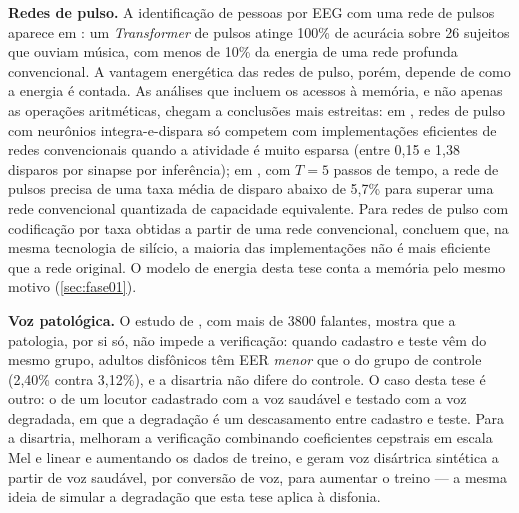 			\par \textbf{Redes de pulso.} A identificação de pessoas por \ac{EEG} com uma rede de pulsos aparece em : um \textit{Transformer} de pulsos atinge 100\% de acurácia sobre 26 sujeitos que ouviam música, com menos de 10\% da energia de uma rede profunda convencional. A vantagem energética das redes de pulso, porém, depende de como a energia é contada. As análises que incluem os acessos à memória, e não apenas as operações aritméticas, chegam a conclusões mais estreitas: em , redes de pulso com neurônios integra-e-dispara só competem com implementações eficientes de redes convencionais quando a atividade é muito esparsa (entre 0,15 e 1,38 disparos por sinapse por inferência); em , com $T=5$ passos de tempo, a rede de pulsos precisa de uma taxa média de disparo abaixo de 5,7\% para superar uma rede convencional quantizada de capacidade equivalente. Para redes de pulso com codificação por taxa obtidas a partir de uma rede convencional,  concluem que, na mesma tecnologia de silício, a maioria das implementações não é mais eficiente que a rede original. O modelo de energia desta tese conta a memória pelo mesmo motivo (\autoref{sec:fase01}).

			\par \textbf{Voz patológica.} O estudo de , com mais de 3800 falantes, mostra que a patologia, por si só, não impede a verificação: quando cadastro e teste vêm do mesmo grupo, adultos disfônicos têm \ac{EER} \emph{menor} que o do grupo de controle (2,40\% contra 3,12\%), e a disartria não difere do controle. O caso desta tese é outro: o de um locutor cadastrado com a voz saudável e testado com a voz degradada, em que a degradação é um descasamento entre cadastro e teste. Para a disartria,  melhoram a verificação combinando coeficientes cepstrais em escala Mel e linear e aumentando os dados de treino, e \cite{salim2024advancing} geram voz disártrica sintética a partir de voz saudável, por conversão de voz, para aumentar o treino --- a mesma ideia de simular a degradação que esta tese aplica à disfonia.

